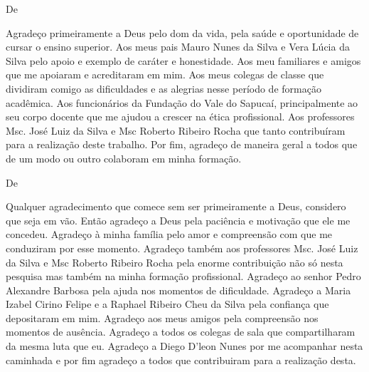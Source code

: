 \begin{agradecimentos}

De \imprimirAutorUm
\newline
	\par Agradeço primeiramente a Deus pelo dom da vida, pela saúde e oportunidade
de cursar o ensino superior. Aos meus pais Mauro Nunes da Silva e Vera Lúcia da
Silva pelo apoio e exemplo de caráter e honestidade. Aos meu familiares e
amigos que me apoiaram e acreditaram em mim. Aos meus colegas de classe que
dividiram comigo as dificuldades e as alegrias nesse período de formação
acadêmica. Aos funcionários da Fundação do Vale do Sapucaí, principalmente ao
seu corpo docente que me ajudou a crescer na ética profissional. Aos
professores Msc. José Luiz da Silva e Msc Roberto Ribeiro Rocha que tanto
contribuíram para a realização deste trabalho. Por fim, agradeço de maneira
geral a todos que de um modo ou outro colaboram em minha formação.

\vspace*{\fill}
De \imprimirAutorDois
\newline
	\par Qualquer agradecimento que comece sem ser primeiramente a Deus, considero
que seja em vão. Então agradeço a Deus pela paciência e motivação que ele me
concedeu. Agradeço à minha família pelo amor e compreensão com que me conduziram
por esse momento. Agradeço também aos professores Msc. José Luiz da Silva e Msc
Roberto Ribeiro Rocha pela enorme contribuição não só nesta pesquisa mas também
na minha formação profissional. Agradeço ao senhor Pedro Alexandre Barbosa pela
ajuda nos momentos de dificuldade. Agradeço a Maria Izabel Cirino Felipe e a
Raphael Ribeiro Cheu da Silva pela confiança que depositaram em mim. Agradeço
aos meus amigos pela compreensão nos momentos de ausência. Agradeço a todos os
colegas de sala que compartilharam da mesma luta que eu. Agradeço a Diego
D'leon Nunes por me acompanhar nesta caminhada e por fim agradeço a todos que
contribuiram para a realização desta.

\end{agradecimentos}




